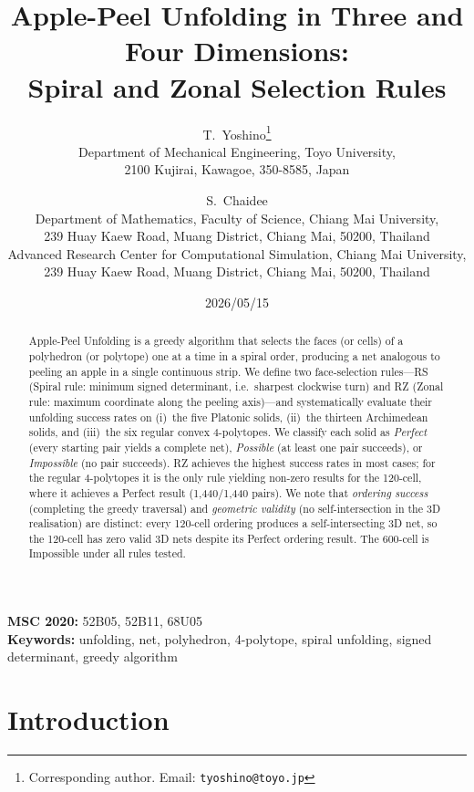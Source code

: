 \documentclass[12pt]{article}
\title{Apple-Peel Unfolding in Three and Four Dimensions:\\[0.3em]
       Spiral and Zonal Selection Rules}
\author{
  T.~Yoshino\thanks{Corresponding author.
    Email: \texttt{tyoshino@toyo.jp}}\\
  \small Department of Mechanical Engineering, Toyo University,\\
  \small 2100 Kujirai, Kawagoe, 350-8585, Japan
  \and
  S.~Chaidee\\
  \small Department of Mathematics, Faculty of Science,
         Chiang Mai University,\\
  \small 239 Huay Kaew Road, Muang District,
         Chiang Mai, 50200, Thailand\\
  \small Advanced Research Center for Computational Simulation,
         Chiang Mai University,\\
  \small 239 Huay Kaew Road, Muang District,
         Chiang Mai, 50200, Thailand
}
\date{2026/05/15}
\theoremstyle{definition}
\begin{document}
\maketitle

\noindent\textbf{MSC 2020:} 52B05, 52B11, 68U05\\
\noindent\textbf{Keywords:} unfolding, net, polyhedron, 4-polytope,
spiral unfolding, signed determinant, greedy algorithm

\bigskip

\begin{abstract}
Apple-Peel Unfolding is a greedy algorithm that selects the faces (or cells)
of a polyhedron (or polytope) one at a time in a spiral order,
producing a net analogous to peeling an apple in a single continuous strip.
We define two face-selection rules---RS (Spiral rule: minimum signed determinant,
i.e.\ sharpest clockwise turn) and
RZ (Zonal rule: maximum coordinate along the peeling axis)---and systematically
evaluate their unfolding success rates on
(i)~the five Platonic solids,
(ii)~the thirteen Archimedean solids, and
(iii)~the six regular convex 4-polytopes.
We classify each solid as \emph{Perfect} (every starting pair yields a
complete net), \emph{Possible} (at least one pair succeeds), or
\emph{Impossible} (no pair succeeds).
RZ achieves the highest success rates in most cases;
for the regular 4-polytopes it is the only rule yielding non-zero
results for the 120-cell, where it achieves a Perfect result
(1,440/1,440 pairs).
We note that \emph{ordering success} (completing the greedy traversal)
and \emph{geometric validity} (no self-intersection in the 3D realisation)
are distinct: every 120-cell ordering produces a self-intersecting 3D net,
so the 120-cell has zero valid 3D nets despite its Perfect ordering result.
The 600-cell is Impossible under all rules tested.
\end{abstract}

\tableofcontents

\section{Introduction}
\end{document}
